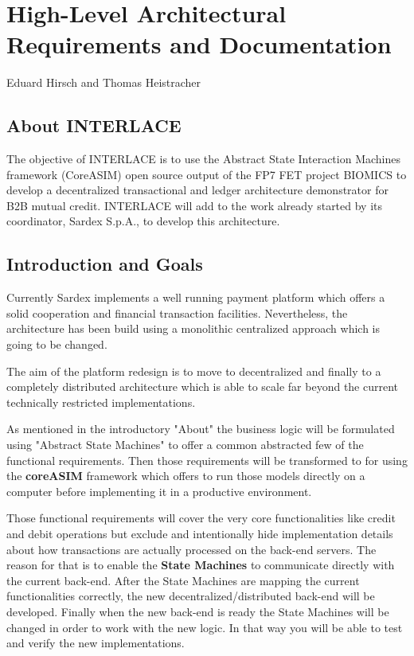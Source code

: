 \chapter{High-Level Architectural Requirements and Documentation}
\label{ch:archreq}

\vspace{-1cm}
\begin{center}
Eduard Hirsch and Thomas Heistracher
\end{center}

\section{About INTERLACE}
The objective of INTERLACE is to use the Abstract State Interaction Machines framework (CoreASIM) open source output of the FP7 FET project BIOMICS to develop a decentralized transactional and ledger architecture demonstrator for B2B mutual credit. INTERLACE will add to the work already started by its coordinator, Sardex S.p.A., to develop this architecture.


\section{Introduction and Goals}\label{section-introduction-and-goals}

Currently Sardex implements a well running payment platform which offers a solid cooperation and financial transaction facilities. Nevertheless, the architecture has been build using a monolithic centralized approach which is going to be changed.

The aim of the platform redesign is to move to decentralized and finally to a completely distributed architecture which is able to scale far beyond the current technically restricted implementations.

As mentioned in the introductory "About" the business logic will be formulated using "Abstract State Machines" to offer a common abstracted few of the functional requirements. Then those requirements will be transformed to for using the \textbf{coreASIM} framework which offers to run those models directly on a computer before implementing it in a productive environment.

Those functional requirements will cover the very core functionalities like credit and debit operations but exclude and intentionally hide implementation details about how transactions are actually processed on the back-end servers. The reason for that is to enable the \textbf{State Machines} to communicate directly with the current back-end. After the State Machines are mapping the current functionalities correctly, the new decentralized/distributed back-end will be developed. Finally when the new back-end is ready the State Machines will be changed in order to work with the new logic. In that way you will be able to test and verify the new implementations.


